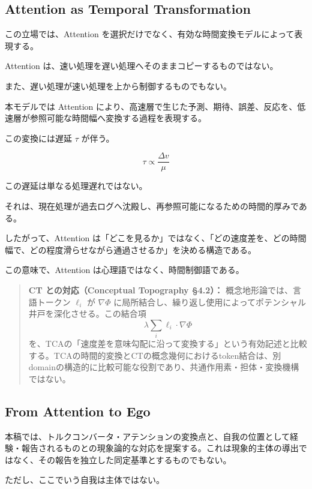 \subsection{Attention as Temporal Transformation}

この立場では、Attention を選択だけでなく、有効な時間変換モデルによって表現する。

Attention は、速い処理を遅い処理へそのままコピーするものではない。

また、遅い処理が速い処理を上から制御するものでもない。

本モデルでは Attention により、高速層で生じた予測、期待、誤差、反応を、低速層が参照可能な時間幅へ変換する過程を表現する。

この変換には遅延 $\tau$ が伴う。

\begin{equation}
\tau \propto \frac{\Delta v}{\mu}
\end{equation}

この遅延は単なる処理遅れではない。

それは、現在処理が過去ログへ沈殿し、再参照可能になるための時間的厚みである。

したがって、Attention は「どこを見るか」ではなく、「どの速度差を、どの時間幅で、どの程度滑らせながら通過させるか」を決める構造である。

この意味で、Attention は心理語ではなく、時間制御語である。

\begin{quote}
\textbf{CT との対応（Conceptual Topography §4.2）：} 概念地形論では、言語トークン $\ell_{i}$ が $\nabla\Phi$ に局所結合し、繰り返し使用によってポテンシャル井戸を深化させる。この結合項
\[
\lambda \sum_i \ell_{i} \cdot \nabla\Phi
\]
を、TCAの「速度差を意味勾配に沿って変換する」という有効記述と比較する。TCAの時間的変換とCTの概念幾何におけるtoken結合は、別domainの構造的に比較可能な役割であり、共通作用素・担体・変換機構ではない。
\end{quote}

\subsection{From Attention to Ego}

本稿では、トルクコンバータ・アテンションの変換点と、自我の位置として経験・報告されるものとの現象論的な対応を提案する。これは現象的主体の導出ではなく、その報告を独立した同定基準とするものでもない。

ただし、ここでいう自我は主体ではない。

